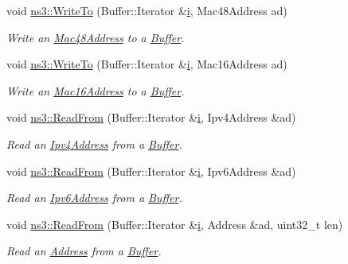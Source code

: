 \begin{DoxyCompactItemize}
void \hyperlink{namespacens3_a5379d97874b31685fed8171d7a20d52c}{ns3\+::\+Write\+To} (Buffer\+::\+Iterator \&\hyperlink{lte__uplink__power__control_8m_a6f6ccfcf58b31cb6412107d9d5281426}{i}, Mac48\+Address ad)
\begin{DoxyCompactList}\small\item\em Write an \hyperlink{classns3_1_1Mac48Address}{Mac48\+Address} to a \hyperlink{classns3_1_1Buffer}{Buffer}. \end{DoxyCompactList}\item 
void \hyperlink{namespacens3_a908523d5ea187cffc78306222f9f6f08}{ns3\+::\+Write\+To} (Buffer\+::\+Iterator \&\hyperlink{lte__uplink__power__control_8m_a6f6ccfcf58b31cb6412107d9d5281426}{i}, Mac16\+Address ad)
\begin{DoxyCompactList}\small\item\em Write an \hyperlink{classns3_1_1Mac16Address}{Mac16\+Address} to a \hyperlink{classns3_1_1Buffer}{Buffer}. \end{DoxyCompactList}\item 
void \hyperlink{namespacens3_aeeba9f1570f031f9e401f76f51943805}{ns3\+::\+Read\+From} (Buffer\+::\+Iterator \&\hyperlink{lte__uplink__power__control_8m_a6f6ccfcf58b31cb6412107d9d5281426}{i}, Ipv4\+Address \&ad)
\begin{DoxyCompactList}\small\item\em Read an \hyperlink{classns3_1_1Ipv4Address}{Ipv4\+Address} from a \hyperlink{classns3_1_1Buffer}{Buffer}. \end{DoxyCompactList}\item 
void \hyperlink{namespacens3_a67001810e29fd2fde4394e59a358c440}{ns3\+::\+Read\+From} (Buffer\+::\+Iterator \&\hyperlink{lte__uplink__power__control_8m_a6f6ccfcf58b31cb6412107d9d5281426}{i}, Ipv6\+Address \&ad)
\begin{DoxyCompactList}\small\item\em Read an \hyperlink{classns3_1_1Ipv6Address}{Ipv6\+Address} from a \hyperlink{classns3_1_1Buffer}{Buffer}. \end{DoxyCompactList}\item 
void \hyperlink{namespacens3_a08dd06737df2cd4ada36c07794496f61}{ns3\+::\+Read\+From} (Buffer\+::\+Iterator \&\hyperlink{lte__uplink__power__control_8m_a6f6ccfcf58b31cb6412107d9d5281426}{i}, Address \&ad, uint32\+\_\+t len)
\begin{DoxyCompactList}\small\item\em Read an \hyperlink{classns3_1_1Address}{Address} from a \hyperlink{classns3_1_1Buffer}{Buffer}. \end{DoxyCompactList}\item 

\end{DoxyCompactItemize}
